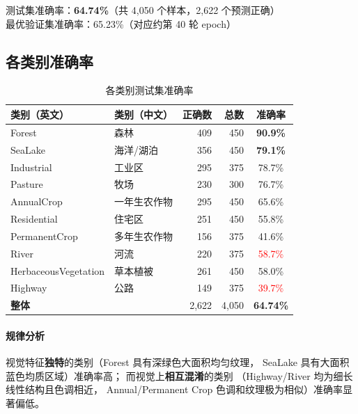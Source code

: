 \documentclass[12pt, a4paper]{article}
\begin{document}
\begin{resultbox}
  测试集准确率：\textbf{64.74\%}（共 4,050 个样本，2,622 个预测正确）\\
  最优验证集准确率：65.23\%（对应约第 40 轮 epoch）
\end{resultbox}

\subsection{各类别准确率}

\begin{table}[H]
  \centering
  \caption{各类别测试集准确率}
  \label{tab:per_class}
  \begin{tabular}{llrrc}
    \toprule
    \textbf{类别（英文）} & \textbf{类别（中文）} & \textbf{正确数} & \textbf{总数} & \textbf{准确率} \\
    \midrule
    Forest               & 森林         & 409 & 450 & \textbf{90.9\%} \\
    SeaLake              & 海洋/湖泊    & 356 & 450 & \textbf{79.1\%} \\
    Industrial           & 工业区       & 295 & 375 & 78.7\% \\
    Pasture              & 牧场         & 230 & 300 & 76.7\% \\
    AnnualCrop           & 一年生农作物 & 295 & 450 & 65.6\% \\
    Residential          & 住宅区       & 251 & 450 & 55.8\% \\
    PermanentCrop        & 多年生农作物 & 156 & 375 & 41.6\% \\
    River                & 河流         & 220 & 375 & \textcolor{red}{58.7\%} \\
    HerbaceousVegetation & 草本植被     & 261 & 450 & 58.0\% \\
    Highway              & 公路         & 149 & 375 & \textcolor{red}{39.7\%} \\
    \midrule
    \textbf{整体} &  & 2{,}622 & 4{,}050 & \textbf{64.74\%} \\
    \bottomrule
  \end{tabular}
\end{table}

\paragraph{规律分析}
视觉特征\textbf{独特}的类别（Forest 具有深绿色大面积均匀纹理，
SeaLake 具有大面积蓝色均质区域）准确率高；
而视觉上\textbf{相互混淆}的类别
（Highway/River 均为细长线性结构且色调相近，
Annual/Permanent Crop 色调和纹理极为相似）准确率显著偏低。
\end{document}
